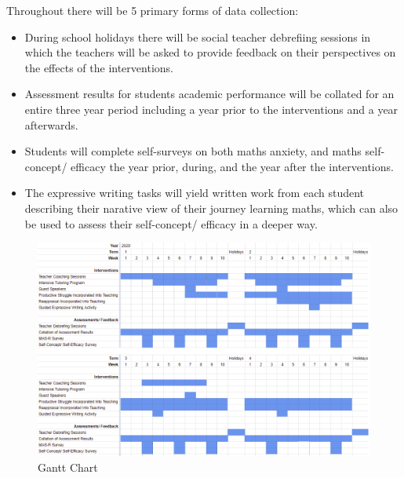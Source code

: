\documentclass[14pt]{memoir}
\begin{document}
 Throughout there will be 5 primary forms of data collection:
 \begin{itemize}
 	\item  During school holidays there will be social teacher debrefiing sessions in which the teachers will be asked to provide feedback on their perspectives on the effects of the interventions.
 	\item Assessment results for students academic performance will be collated for an entire three year period including a year prior to the interventions and a year afterwards.
 	\item Students will complete self-surveys on both maths anxiety, and maths self-concept/ efficacy the year prior, during, and the year after the interventions.
 	\item The expressive writing tasks will yield written work from each student describing their narative view of their journey learning maths, which can also be used to assess their self-concept/ efficacy in a deeper way.
 \end{itemize}
 
 

 \begin{figure}
 \includegraphics[scale=0.7]{Gantt_Chart.PNG}
\caption{Gantt Chart \label{fig:gantt}}
\end{figure}
\end{document}
